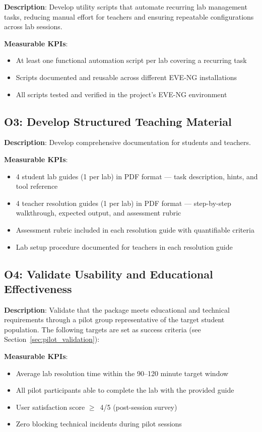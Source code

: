 \textbf{Description}: Develop utility scripts that automate recurring lab management tasks, reducing manual effort for teachers and ensuring repeatable configurations across lab sessions.

\textbf{Measurable KPIs}:
\begin{itemize}
\item At least one functional automation script per lab covering a recurring task
\item Scripts documented and reusable across different EVE-NG installations
\item All scripts tested and verified in the project's EVE-NG environment
\end{itemize}

\subsection{O3: Develop Structured Teaching Material}

\textbf{Description}: Develop comprehensive documentation for students and teachers.

\textbf{Measurable KPIs}:
\begin{itemize}
\item 4 student lab guides (1 per lab) in PDF format --- task description,
      hints, and tool reference
\item 4 teacher resolution guides (1 per lab) in PDF format --- step-by-step
      walkthrough, expected output, and assessment rubric
\item Assessment rubric included in each resolution guide with quantifiable criteria
\item Lab setup procedure documented for teachers in each resolution guide
\end{itemize}

\subsection{O4: Validate Usability and Educational Effectiveness}

\textbf{Description}: Validate that the package meets educational and technical requirements through a pilot group representative of the target student population. The following targets are set as success criteria (see Section~\ref{sec:pilot_validation}):

\textbf{Measurable KPIs}:
\begin{itemize}
\item Average lab resolution time within the 90--120 minute target window
\item All pilot participants able to complete the lab with the provided guide
\item User satisfaction score $\geq$~4/5 (post-session survey)
\item Zero blocking technical incidents during pilot sessions
\end{itemize}

